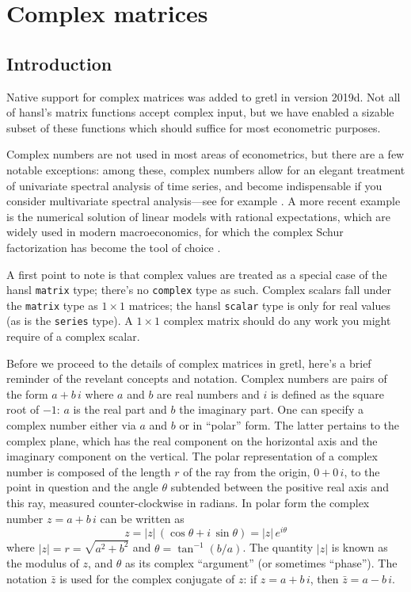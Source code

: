 \chapter{Complex matrices}
\label{chap:complex}

\section{Introduction}
\label{sec:cmplx-intro}

Native support for complex matrices was added to gretl in version
2019d. Not all of hansl's matrix functions accept complex input, but
we have enabled a sizable subset of these functions which should
suffice for most econometric purposes.

Complex numbers are not used in most areas of econometrics, but there
are a few notable exceptions: among these, complex numbers allow for
an elegant treatment of univariate spectral analysis of time series,
and become indispensable if you consider multivariate spectral
analysis---see for example \cite{shumwaystoffer2017}. A more recent
example is the numerical solution of linear models with rational
expectations, which are widely used in modern macroeconomics, for
which the complex Schur factorization has become the tool of choice
\citep{klein2000}.

A first point to note is that complex values are treated as a special
case of the hansl \texttt{matrix} type; there's no \texttt{complex}
type as such. Complex scalars fall under the \texttt{matrix} type as
$1 \times 1$ matrices; the hansl \texttt{scalar} type is only for real
values (as is the \texttt{series} type). A $1 \times 1$ complex matrix
should do any work you might require of a complex scalar.

Before we proceed to the details of complex matrices in gretl, here's
a brief reminder of the revelant concepts and notation. Complex
numbers are pairs of the form $a + b\,i$ where $a$ and $b$ are real
numbers and $i$ is defined as the square root of $-1$: $a$ is the real
part and $b$ the imaginary part. One can specify a complex number
either via $a$ and $b$ or in ``polar'' form. The latter pertains to
the complex plane, which has the real component on the horizontal axis
and the imaginary component on the vertical. The polar representation
of a complex number is composed of the length $r$ of the ray from the
origin, $0 + 0\,i$, to the point in question and the angle $\theta$
subtended between the positive real axis and this ray, measured
counter-clockwise in radians. In polar form the complex number
$z = a + b\,i$ can be written as
\[
  z = |z|\,(\cos \theta + i\,\sin \theta) = |z|\,e^{i\theta}
\]
where $|z| = r = \sqrt{a^2 + b^2}$ and $\theta = \tan^{-1}(b/a)$. The
quantity $|z|$ is known as the modulus of $z$, and $\theta$ as its
complex ``argument'' (or sometimes ``phase''). The notation $\bar{z}$
is used for the complex conjugate of $z$: if $z = a + b\,i$, then
$\bar{z} = a - b\,i$.




